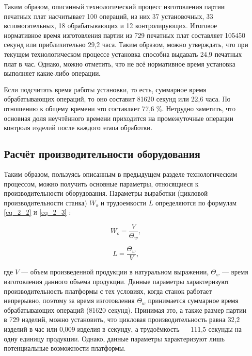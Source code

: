 Таким образом, описанный технологический процесс изготовления партии печатных плат насчитывает 100 операций, из них 37 установочных, 33 вспомогательных, 18 обрабатывающих и 12 контролирующих. Итоговое нормативное время изготовления партии из 729 печатных плат составляет 105450 секунд или приблизительно 29,2 часа. Таким образом, можно утверждать, что при текущем технологическом процессе установка способна выдавать 24,9 печатных плат в час. Однако, можно отметить, что не всё нормативное время установка выполняет какие-либо операции.

Если подсчитать время работы установки, то есть, суммарное время обрабатывающих операций, то оно составит 81620 секунд или 22,6 часа. По отношению к общему времени это составляет 77,6 \%. Нетрудно заметить, что основная доля неучтённого времени приходится на промежуточные операции контроля изделий после каждого этапа обработки.

\subsection{Расчёт производительности оборудования} \label{ssect2_3_3}

Таким образом, пользуясь описанным в предыдущем разделе технологическим процессом, можно получить основные параметры, относящиеся к производительности оборудования. Параметры выработки (цикловой производительности станка) $W_o$ и трудоемкости $L$ определяются по формулам \ref{eq_2_2} и \ref{eq_2_3} \cite{web:raschet-cnc}:

\begin{equation}
W_o = \frac{V}{\Theta_w},
\label{eq_2_2}
\end{equation}

\begin{equation}
L = \frac{\Theta_w}{V},
\label{eq_2_3}
\end{equation}

где $V$ --- объем произведенной продукции в натуральном выражении, $\Theta_w$ --- время изготовления данного объема продукции. Данные параметры характеризуют производительность платформы с тех условиях, когда станок работает непрерывно, поэтому за время изготовления $\Theta_w$ принимается суммарное время обрабатывающих операций (81620 секунд). Принимая это, а также размер партии в 729 изделий, можно установить, что цикловая производительность равна 32,2 изделий в час или 0,009 изделия в секунду, а трудоёмкость --- 111,5 секунды на одну единицу продукции. Однако, данные параметры характеризуют лишь потенциальные возможности платформы.

